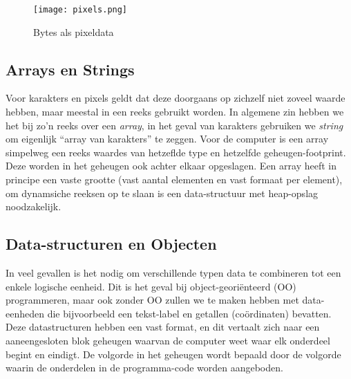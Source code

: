 \begin{figure}[ht]
    \centering
    \texttt{[image: pixels.png]}
    \caption{Bytes als pixeldata}
    \label{fig:pixel}
\end{figure}

\subsection{Arrays en Strings}
Voor karakters en pixels geldt dat deze doorgaans op zichzelf niet zoveel waarde hebben, maar meestal in een reeks gebruikt worden. In algemene zin hebben we het bij zo'n reeks over een \emph{array}, in het geval van karakters gebruiken we \emph{string} om eigenlijk \enquote{array van karakters} te zeggen. Voor de computer is een array simpelweg een reeks waardes van hetzeflde type en hetzelfde geheugen-footprint. Deze worden in het geheugen ook achter elkaar opgeslagen. Een array heeft in principe een vaste grootte (vast aantal elementen en vast formaat per element), om dynamsiche reeksen op te slaan is een data-structuur met heap-opslag noodzakelijk.

\subsection{Data-structuren en Objecten}
In veel gevallen is het nodig om verschillende typen data te combineren tot een enkele logische eenheid. Dit is het geval bij object-geori\"enteerd (OO) programmeren, maar ook zonder OO zullen we te maken hebben met data-eenheden die bijvoorbeeld een tekst-label en getallen (co\"ordinaten) bevatten. Deze datastructuren hebben een vast format, en dit vertaalt zich naar een aaneengesloten blok geheugen waarvan de computer weet waar elk onderdeel begint en eindigt. De volgorde in het geheugen wordt bepaald door de volgorde waarin de onderdelen in de programma-code worden aangeboden.
